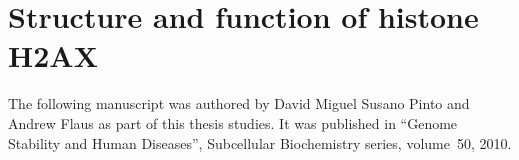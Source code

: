 \chapter{Structure and function of histone H2AX}
  \label{app:h2ax-review}

  The following manuscript was authored by David Miguel Susano Pinto and
  Andrew Flaus as part of this thesis studies. It was published in ``Genome
  Stability and Human Diseases'', Subcellular Biochemistry series, volume~50,
  2010.

  
